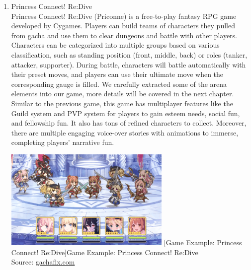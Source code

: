 \documentclass[12pt,oneside,openright,a4paper]{cpe-english-project}
\begin{document}
\begin{enumerate}
	\item Princess Connect! Re:Dive \\
	Princess Connect! Re:Dive (Priconne) is a free-to-play fantasy RPG game developed by Cygames. Players can build teams of characters they pulled from gacha and use them to clear dungeons and battle with other players. Characters can be categorized into multiple groups based on various classification, such as standing position (front, middle, back) or roles (tanker, attacker, supporter). During battle, characters will battle automatically with their preset moves, and players can use their ultimate move when the corresponding gauge is filled. We carefully extracted some of the arena elements into our game, more details will be covered in the next chapter. \\
	Similar to the previous game, this game has multiplayer features like the Guild system and PVP system for players to gain esteem needs, social fun, and fellowship fun. It also has tons of refined characters to collect. Moreover, there are multiple engaging voice-over stories with animations to immerse, completing players' narrative fun. \\
	\begin{minipage}[c]{\textwidth}\centering
	\includegraphics[width=8cm]{figure/related-work-princon.png}
	[Game Example: Princess Connect! Re:Dive]{Game Example: Princess Connect! Re:Dive 
		\\ Source: \href{https://gachafix.com/is-princess-connect-good/}{gachafix.com}}
	\label{fig:related-work-princon}
	\end{minipage}


\end{enumerate}
\end{document}
